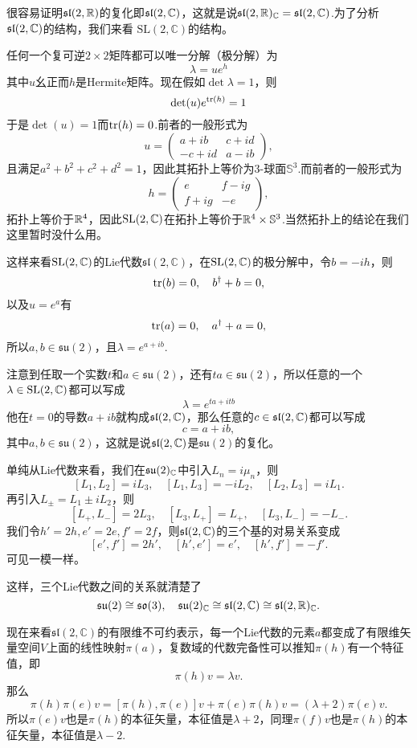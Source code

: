 很容易证明$\mathfrak{sl}(2,\mathbb{R})$的复化即$\mathfrak{sl}(2,\mathbb{C})$，这就是说$\mathfrak{sl}(2,\mathbb{R})_{\mathbb{C}}=\mathfrak{sl}(2,\mathbb{C})$.为了分析$\mathfrak{sl}(2,\mathbb{C})$的结构，我们来看
$\mathrm{SL}(2,\mathbb{C})$的结构。

任何一个复可逆$2\times 2$矩阵都可以唯一分解（极分解）为
\[
\lambda=ue^{h}
\]
其中$u$幺正而$h$是Hermite矩阵。现在假如$\det \lambda=1$，则
\[
\det(u)e^{\operatorname{tr}(h)}=1
\]
于是$\det(u)=1$而$\operatorname{tr}(h)=0$.前者的一般形式为
\[
u=
\begin{pmatrix}
a+ib&c+id\\
-c+id&a-ib
\end{pmatrix},
\]
且满足$a^2+b^2+c^2+d^2=1$，因此其拓扑上等价为3-球面$\mathbb{S}^3$.而前者的一般形式为
\[
h=\begin{pmatrix}
e&f-ig\\
f+ig&-e
\end{pmatrix},
\]
拓扑上等价于$\mathbb{R}^4$，因此$\mathrm{SL}(2,\mathbb{C})$在拓扑上等价于$\mathbb{R}^4\times \mathbb{S}^3$.当然拓扑上的结论在我们这里暂时没什么用。

这样来看$\mathrm{SL}(2,\mathbb{C})$的Lie代数$\mathfrak{sl}(2,\mathbb{C})$，在$\mathrm{SL}(2,\mathbb{C})$的极分解中，令$b=-ih$，则
\[
\operatorname{tr}(b)=0,\quad b^\dag+b=0,
\]
以及$u=e^a$有
\[
\operatorname{tr}(a)=0,\quad a^\dag+a=0,
\]
所以$a,b\in\mathfrak{su}(2)$，且$\lambda=e^{a+ib}$.

注意到任取一个实数$t$和$a\in\mathfrak{su}(2)$，还有$ta \in\mathfrak{su}(2)$，所以任意的一个$\lambda \in \mathrm{SL}(2,\mathbb{C})$都可以写成
\[
\lambda=e^{ta+itb}
\]
他在$t=0$的导数$a+ib$就构成$\mathfrak{sl}(2,\mathbb{C})$，那么任意的$c\in \mathfrak{sl}(2,\mathbb{C})$都可以写成
\[
c=a+ib,
\]
其中$a,b\in\mathfrak{su}(2)$，这就是说$\mathfrak{sl}(2,\mathbb{C})$是$\mathfrak{su}(2)$的复化。

单纯从Lie代数来看，我们在$\mathfrak{su}(2)_{\mathbb{C}}$中引入$L_n=i\mu_n$，则
\[
	[L_1,L_2]=iL_3,\quad [L_1,L_3]=-iL_2,\quad [L_2,L_3]=iL_1.
\]
再引入$L_\pm=L_1\pm iL_2$，则
\[
	[L_+,L_-]=2L_3,\quad [L_3,L_+]=L_+,\quad [L_3,L_-]=-L_-.
\]
我们令$h'=2h,e'=2e,f'=2f$，则$\mathfrak{sl}(2,\mathbb{C})$的三个基的对易关系变成
\[
[e',f']=2h',\quad[h',e']=e',\quad[h',f']=-f'.
\]
可见一模一样。

这样，三个Lie代数之间的关系就清楚了
\[
	\mathfrak{su}(2)\cong\mathfrak{so}(3),\quad \mathfrak{su}(2)_{\mathbb{C}}\cong \mathfrak{sl}(2,\mathbb{C}) \cong\mathfrak{sl}(2,\mathbb{R})_{\mathbb{C}}.
\]

现在来看$\mathfrak{sl}(2,\mathbb{C})$的有限维不可约表示，每一个Lie代数的元素$a$都变成了有限维矢量空间$V$上面的线性映射$\pi(a)$，复数域的代数完备性可以推知$\pi(h)$有一个特征值，即
\[
	\pi(h)v=\lambda v.
\]
那么
\[
	\pi(h)\pi(e)v=[\pi(h),\pi(e)]v+\pi(e)\pi(h)v=(\lambda+2)\pi(e)v.
\]
所以$\pi(e)v$也是$\pi(h)$的本征矢量，本征值是$\lambda+2$，同理$\pi(f)v$也是$\pi(h)$的本征矢量，本征值是$\lambda-2$.

